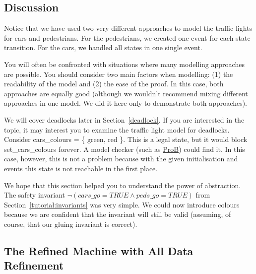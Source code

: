 
\subsection{Discussion}
\label{tut_concepts_discussion}

Notice that we have used two very different approaches to model the traffic lights for cars and pedestrians.  For the pedestrians, we created one event for each state transition.  For the cars, we handled all states in one single event.

You will often be confronted with situations where many modelling approaches are possible.  You should consider two main factors when modelling: (1) the readability of the model and (2) the ease of the proof.  In this case, both approaches are equally good (although we wouldn't recommend mixing different approaches in one model. We did it here only to demonstrate both approaches).

We will cover deadlocks later in Section~\ref{deadlock}.  If you are interested in the topic, it may interest you to examine the traffic light model for deadlocks.  Consider \textsf{cars\_colours = \{ green, red \}}. This is a legal state, but it would block \textsf{set\_cars\_colours} forever.  A model checker (such as \href{http://www.stups.uni-duesseldorf.de/ProB}{ProB}) could find it.  In this case, however, this is not a problem because with the given initialisation and events this state is not reachable in the first place.

We hope that this section helped you to understand the power of abstraction.  The safety invariant
$\lnot(cars\_go = TRUE \land peds\_go = TRUE)$ from Section~\ref{tutorial:invariants} was very simple.  We could now introduce colours because we are confident that the invariant will still be valid (assuming, of course, that our gluing invariant is correct).

\subsection{The Refined Machine with All Data Refinement}
\label{tut_the_refined_machine_with_all_data_refinement}

